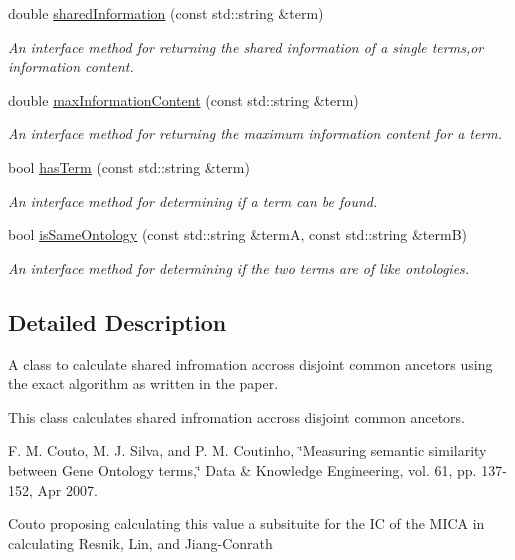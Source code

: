 \begin{DoxyCompactItemize}
double \hyperlink{classCoutoGraSMSharedInformation_a1c9a0a709b77822cd3bc967beed08b66}{shared\+Information} (const std\+::string \&term)
\begin{DoxyCompactList}\small\item\em An interface method for returning the shared information of a single terms,or information content. \end{DoxyCompactList}\item 
double \hyperlink{classCoutoGraSMSharedInformation_ae97d2b59ecd6d1eeee2583c6005c65a2}{max\+Information\+Content} (const std\+::string \&term)
\begin{DoxyCompactList}\small\item\em An interface method for returning the maximum information content for a term. \end{DoxyCompactList}\item 
bool \hyperlink{classCoutoGraSMSharedInformation_a718055d6fecea9e10125ae4895af7f95}{has\+Term} (const std\+::string \&term)
\begin{DoxyCompactList}\small\item\em An interface method for determining if a term can be found. \end{DoxyCompactList}\item 
bool \hyperlink{classCoutoGraSMSharedInformation_ae6e12a30f03b0c2232d73277d8d47cd1}{is\+Same\+Ontology} (const std\+::string \&termA, const std\+::string \&termB)
\begin{DoxyCompactList}\small\item\em An interface method for determining if the two terms are of like ontologies. \end{DoxyCompactList}\end{DoxyCompactItemize}


\subsection{Detailed Description}
A class to calculate shared infromation accross disjoint common ancetors using the exact algorithm as written in the paper. 

This class calculates shared infromation accross disjoint common ancetors.

F. M. Couto, M. J. Silva, and P. M. Coutinho, \char`\"{}\+Measuring semantic similarity
between Gene Ontology terms,\char`\"{} Data \& Knowledge Engineering, vol. 61, pp. 137-\/152, Apr 2007.

Couto proposing calculating this value a subsituite for the IC of the M\+I\+CA in calculating Resnik, Lin, and Jiang-\/\+Conrath 


